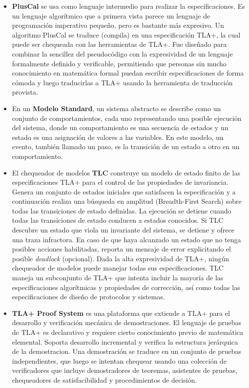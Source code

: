 \documentclass[spanish]{llncs}
\begin{document}
  \begin{itemize}
    \item \textbf{PlusCal} se usa como lenguaje intermedio para realizar la especificaciones. Es un lenguaje algorítmico que a primera vista parece un lenguaje de programación imperativo pequeño, pero es bastante más expresivo. Un algoritmo PlusCal se traduce (compila) en una especificación TLA+, la cual puede ser chequeada con las herramientas de TLA+.
	  Fue diseñado para combinar la sencillez del pseudocódigo con la expresividad de un lenguaje formalmente definido y verificable, permitiendo que personas sin mucho conocimiento en matemática formal puedan escribir especificaciones de forma cómoda y luego traducirlas a TLA+ usando la herramienta de traducción provista.
    \item En un \textbf{Modelo Standard}, un sistema abstracto se describe como un conjunto de comportamientos, cada uno representando una posible ejecución del sistema, donde un comportamiento es una secuencia de estados y un estado es una asignación de valores a las variables.
	  En este modelo, un evento, también llamado un paso, es la transición de un estado a otro en un comportamiento.
    \item El chequeador de modelos \textbf{TLC} construye un modelo de estado finito de las especificaciones TLA+ para el control de las propiedades de invariancia.
	  Genera un conjunto de estados iniciales que satisfacen la especificación y a continuación realiza una búsqueda en amplitud (Breadth-First Search) sobre todas las transiciones de estado definidas. 
	  La ejecución se detiene cuando todas las transiciones de estado conducen a estados conocidos. Si TLC descubre un estado que viola un invariante del sistema, se detiene y ofrece una traza infractora. En caso de que haya alcanzado un estado que no tenga posibles acciones habilitadas, reporta un mensaje de error explicitando el posible \textit{deadlock} (opcional).
	  Dada la alta expresividad de TLA+, ningún chequeador de modelos puede manejar todas sus especificaciones. TLC maneja un subconjunto de TLA+ que intenta incluir la mayoría de las especificaciones algorítmicas y propiedades de corrección, así como todas las especificaciones de diseño de protocolos y sistemas.
    \item \textbf{TLA+ Proof System} es una plataforma que extiende a TLA+ para el desarrollo y verificación mecánica de demostraciones. 
	  El lenguaje de pruebas de TLA+ es declarativo y requiere cierto conocimiento previo de matemática elemental. Soporta desarrollo incremental y verifica la estructura jerárquica de la demostracion. Una demostración se traduce en un conjunto de pruebas independientes, que luego se intentan chequear usando una colección de verificadores que incluye demostradores de teoremas, asistentes de pruebas, chequeadores de satisfacibilidad y procedimientos de decisión.

\end{itemize}
\end{document}
